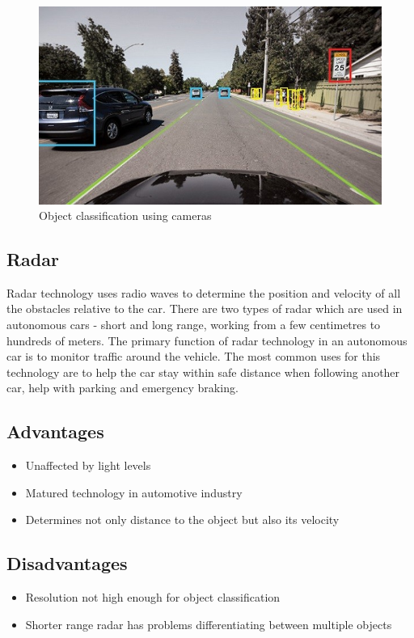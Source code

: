  
   \begin{figure}[H]
\centering
\includegraphics[width=\textwidth]{Figures/ConAnalysis/General/camera.jpg}
\caption{Object classification using cameras\cite{nvidiadr29:online}}
\end{figure}
 
\subsection{Radar}
Radar technology uses radio waves to determine the position and velocity of all the obstacles relative to the car. There are two types of radar which are used in autonomous cars - short and long range, working from a few centimetres to hundreds of meters. The primary function of radar technology in an autonomous car is to monitor traffic around the vehicle. The most common uses for this technology are to help the car stay within safe distance when following another car, help with parking and emergency braking. \cite{Autonomo37:online}

\subsection*{Advantages}
\begin{itemize}
  \item Unaffected by light levels
  \item Matured technology in automotive industry
  \item Determines not only distance to the object but also its velocity
\end{itemize}
\subsection*{Disadvantages}
\begin{itemize}
  \item Resolution not high enough for object classification
  \item Shorter range radar has problems differentiating between multiple objects
\end{itemize}
 \cite{LidarRad25:online}
 
